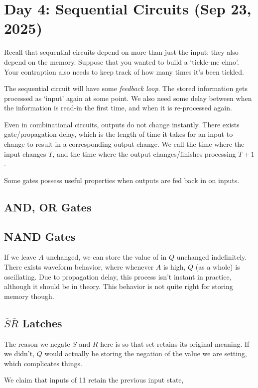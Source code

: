 \section{Day 4: Sequential Circuits (Sep 23, 2025)}

Recall that sequential circuits depend on more than just the input: they also depend on the memory. Suppose that you wanted to build a `tickle-me elmo'. Your contraption also needs to keep track of how many times it's been tickled.

The sequential circuit will have some \textit{feedback loop}. The stored information gets processed as `input' again at some point. We also need some delay between when the information is read-in the first time, and when it is re-processed again.

Even in combinational circuits, outputs do not change instantly. There exists gate/propagation delay, which is the length of time it takes for an input to change to result in a corresponding output change. We call the time where the input changes $T$, and the time where the output changes/finishes processing $T+1$.

Some gates possess useful properties when outputs are fed back in on inputs.

\subsection*{AND, OR Gates}

\subsection*{NAND Gates}
If we leave $A$ unchanged, we can store the value of in $Q$ unchanged indefinitely. There exists waveform behavior, where whenever $A$ is high, $Q$ (as a whole) is oscillating. Due to propagation delay, this process isn't instant in practice, although it should be in theory. This behavior is not quite right for storing memory though.

\subsection{$\overline{S}\overline{R}$ Latches}

The reason we negate $S$ and $R$ here is so that set retains its original meaning. If we didn't, $Q$ would actually be storing the negation of the value we are setting, which complicates things. 

We claim that inputs of 11 retain the previous input state,

